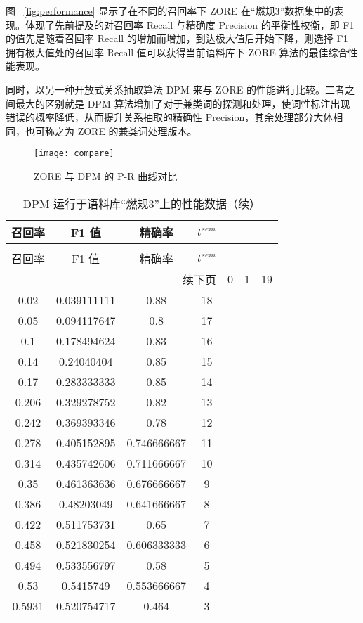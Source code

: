 图 ~\ref{fig:performance} 显示了在不同的召回率下 ZORE 在“燃规3”数据集中的表现。体现了先前提及的对召回率 Recall 与精确度 Precision 的平衡性权衡，即 F1 的值先是随着召回率 Recall 的增加而增加，到达极大值后开始下降，则选择 F1 拥有极大值处的召回率 Recall 值可以获得当前语料库下 ZORE 算法的最佳综合性能表现。

同时，以另一种开放式关系抽取算法 DPM\citep{liyang2016} 来与 ZORE 的性能进行比较。二者之间最大的区别就是 DPM 算法增加了对于兼类词的探测和处理，使词性标注出现错误的概率降低，从而提升关系抽取的精确性 Precision，其余处理部分大体相同，也可称之为 ZORE 的兼类词处理版本。

\begin{figure}[h!]
\centering
\texttt{[image: compare]}
\caption{ZORE 与 DPM 的 P-R 曲线对比}\label{fig:compare}
\end{figure}

\begin{longtable}{|c|c|c|c|}
\caption[DPM 性能数据]{DPM 运行于语料库“燃规3”上的性能数据} \label{tab:DPMperformance} \\
\toprule[1.5pt]
 召回率 & F1 值 & 精确率 & $t^{sem}$\\
\midrule[1pt]
\endfirsthead
\caption[]{DPM 运行于语料库“燃规3”上的性能数据（续）} \\
\toprule[1.5pt]
 召回率 & F1 值 & 精确率 & $t^{sem}$\\
\midrule[1pt]
\endhead
\hline
\multicolumn{4}{r}{\small 续下页}
\endfoot
\bottomrule[1.5pt]
\endlastfoot
0	&	0	&	1	&	19\\
\hline
0.02	&	0.039111111	&	0.88	&	18\\
\hline
0.05	&	0.094117647	&	0.8	&	17\\
\hline
0.1	&	0.178494624	&	0.83	&	16\\
\hline
0.14	&	0.24040404	&	0.85	&	15\\
\hline
0.17	&	0.283333333	&	0.85	&	14\\
\hline
0.206	&	0.329278752	&	0.82	&	13\\
\hline
0.242	&	0.369393346	&	0.78	&	12\\
\hline
0.278	&	0.405152895	&	0.746666667	&	11\\
\hline
0.314	&	0.435742606	&	0.711666667	&	10\\
\hline
0.35	&	0.461363636	&	0.676666667	&	9\\
\hline
0.386	&	0.48203049	&	0.641666667	&	8\\
\hline
0.422	&	0.511753731	&	0.65	&	7\\
\hline
0.458	&	0.521830254	&	0.606333333	&	6\\
\hline
0.494	&	0.533556797	&	0.58	&	5\\
\hline
0.53	&	0.5415749	&	0.553666667	&	4\\
\hline
0.5931	&	0.520754717	&	0.464	&	3\\
\end{longtable}

